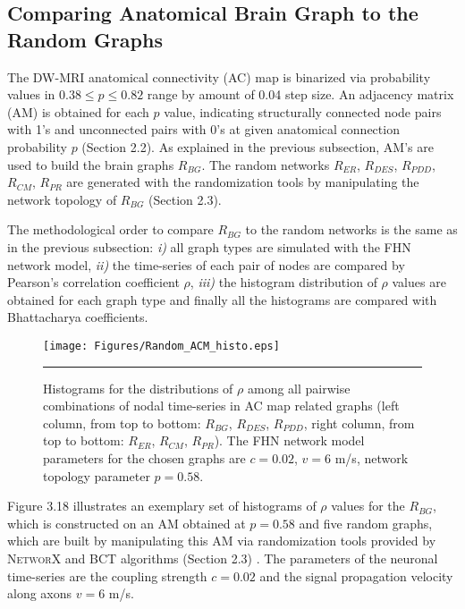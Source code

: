  


\subsection{Comparing Anatomical Brain Graph to the Random Graphs}

The DW-MRI anatomical connectivity (AC) map is binarized via probability values in $0.38 \leq p \leq 0.82$ range by amount of 0.04 step size. An adjacency matrix (AM) is obtained for each $p$ value, indicating structurally connected node pairs with 1's and unconnected pairs with 0's at given anatomical connection probability $p$ (Section 2.2). As explained in the previous subsection, AM's are used to build the brain graphs $R_{BG}$. The random networks $R_{ER}$, $R_{DES}$, $R_{PDD}$, $R_{CM}$, $R_{PR}$ are generated with the randomization tools by manipulating the network topology of $R_{BG}$ (Section 2.3). 

The methodological order to compare $R_{BG}$ to the random networks is the same as in the previous subsection: \textit{i)} all graph types are simulated with the FHN network model, \textit{ii)} the time-series of each pair of nodes are compared by Pearson's correlation coefficient $\rho$, \textit{iii)} the histogram distribution of $\rho$ values are obtained for each graph type and finally all the histograms are compared with Bhattacharya coefficients. 

\begin{figure}[htbp] 
  \centering
	 \texttt{[image: Figures/Random\_ACM\_histo.eps]}
	 \rule{35em}{0.5pt}
  \caption[Histogram Comparison, ACM]{Histograms for the  distributions of $\rho$ among all pairwise combinations of nodal time-series in AC map related graphs (left column, from top to bottom: $R_{BG}$, $R_{DES}$, $R_{PDD}$, right column, from top to bottom: $R_{ER}$, $R_{CM}$, $R_{PR}$).  The FHN network model parameters for the chosen graphs are $c=0.02$, $v=6$ m/s, network topology parameter $p=0.58$. } 
    \label{fig:Histogram Comparison, ACM}
\end{figure}  

Figure 3.18 illustrates an exemplary set of histograms of $\rho$ values for the $R_{BG}$, which is constructed on an AM obtained at $p=0.58$ and five random graphs, which are built by manipulating this AM via randomization tools provided by \textsc{NetworX} and \textsc{BCT} algorithms (Section 2.3) \citep{XYZNETW, XYZBCT}. The parameters of the neuronal time-series are the coupling strength $c=0.02$ and the signal propagation velocity along axons $v=6$ m/s.   


